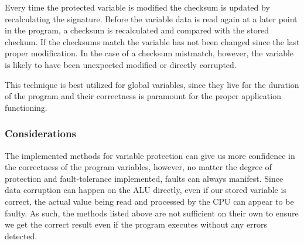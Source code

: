 Every time the protected variable is modified the checksum is updated by recalculating the signature. Before the variable data is read again at a later point in the program, a checksum is recalculated and compared with the stored checkum. If the checksums match the variable has not been changed since the last proper modification. In the case of a checksum mistmatch, however, the variable is likely to have been unexpected modified or directly corrupted.

This technique is best utilized for global variables, since they live for the duration of the program and their correctness is paramount for the proper application functioning.

\subsubsection{Considerations}

The implemented methods for variable protection can give us more confidence in the correctness of the program variables, however, no matter the degree of protection and fault-tolerance implemented, faults can always manifest. Since data corruption can happen on the ALU directly, even if our stored variable is correct, the actual value being read and processed by the CPU can appear to be faulty. As such, the methods listed above are not sufficient on their own to ensure we get the correct result even if the program executes without any errors detected.
